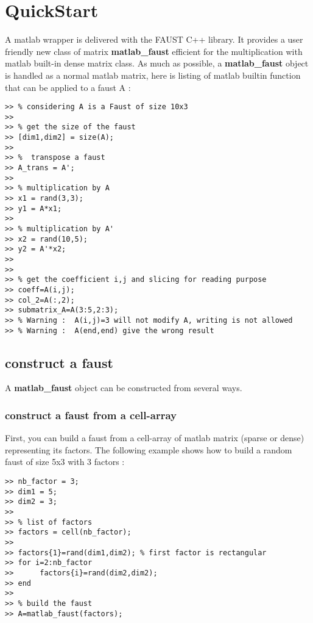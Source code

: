 \section{QuickStart}\label{sec:firstUse}


A matlab wrapper is delivered with the FAUST C++ library.
It provides a user friendly new class of matrix \textbf{matlab{\_}faust} efficient for the multiplication with matlab built-in dense matrix class.\newline
\newline
As much as possible, a \textbf{matlab{\_}faust} object is handled as a normal matlab matrix, here is listing of matlab builtin function that can be applied to a faust A :



\begin{lstlisting}
>> % considering A is a Faust of size 10x3
>>
>> % get the size of the faust
>> [dim1,dim2] = size(A);
>>
>> %  transpose a faust  
>> A_trans = A'; 		 
>> 
>> % multiplication by A
>> x1 = rand(3,3);
>> y1 = A*x1;  
>> 
>> % multiplication by A'
>> x2 = rand(10,5);
>> y2 = A'*x2;
>>
>>
>> % get the coefficient i,j and slicing for reading purpose
>> coeff=A(i,j);
>> col_2=A(:,2);
>> submatrix_A=A(3:5,2:3);
>> % Warning :  A(i,j)=3 will not modify A, writing is not allowed
>> % Warning :  A(end,end) give the wrong result   
\end{lstlisting}



\subsection{construct a faust}\label{sec:firstUseBuild}

A \textbf{matlab{\_}faust} object can be constructed from several ways.
\subsubsection{construct a faust from a cell-array}\label{sec:firstUseBuildFromCellArray}
First, you can build a faust from a cell-array of matlab matrix (sparse or dense) representing its factors.
\newline
\newline
The following example shows how to build a random faust of size 5x3 with 3 factors :
\begin{lstlisting}
>> nb_factor = 3;
>> dim1 = 5;
>> dim2 = 3; 
>>
>> % list of factors
>> factors = cell(nb_factor);
>>
>> factors{1}=rand(dim1,dim2); % first factor is rectangular 
>> for i=2:nb_factor
>> 		factors{i}=rand(dim2,dim2);
>> end
>>
>> % build the faust
>> A=matlab_faust(factors);
\end{lstlisting}
\newpage

